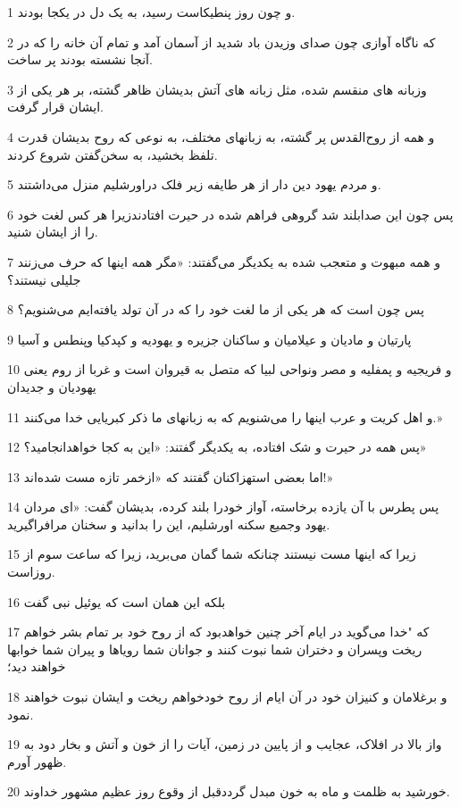 \par 1 و چون روز پنطیکاست رسید، به یک دل در یکجا بودند.
\par 2 که ناگاه آوازی چون صدای وزیدن باد شدید از آسمان آمد و تمام آن خانه را که در آنجا نشسته بودند پر ساخت.
\par 3 وزبانه های منقسم شده، مثل زبانه های آتش بدیشان ظاهر گشته، بر هر یکی از ایشان قرار گرفت.
\par 4 و همه از روح‌القدس پر گشته، به زبانهای مختلف، به نوعی که روح بدیشان قدرت تلفظ بخشید، به سخن‌گفتن شروع کردند.
\par 5 و مردم یهود دین دار از هر طایفه زیر فلک دراورشلیم منزل می‌داشتند.
\par 6 پس چون این صدابلند شد گروهی فراهم شده در حیرت افتادندزیرا هر کس لغت خود را از ایشان شنید.
\par 7 و همه مبهوت و متعجب شده به یکدیگر می‌گفتند: «مگر همه اینها که حرف می‌زنند جلیلی نیستند؟
\par 8 پس چون است که هر یکی از ما لغت خود را که در آن تولد یافته‌ایم می‌شنویم؟
\par 9 پارتیان و مادیان و عیلامیان و ساکنان جزیره و یهودیه و کپدکیا وپنطس و آسیا
\par 10 و فریجیه و پمفلیه و مصر ونواحی لبیا که متصل به قیروان است و غربا از روم یعنی یهودیان و جدیدان
\par 11 و اهل کریت و عرب اینها را می‌شنویم که به زبانهای ما ذکر کبریایی خدا می‌کنند.»
\par 12 پس همه در حیرت و شک افتاده، به یکدیگر گفتند: «این به کجا خواهدانجامید؟»
\par 13 اما بعضی استهزاکنان گفتند که «ازخمر تازه مست شده‌اند!»
\par 14 پس پطرس با آن یازده برخاسته، آواز خودرا بلند کرده، بدیشان گفت: «ای مردان یهود وجمیع سکنه اورشلیم، این را بدانید و سخنان مرافرا‌گیرید.
\par 15 زیرا که اینها مست نیستند چنانکه شما گمان می‌برید، زیرا که ساعت سوم از روزاست.
\par 16 بلکه این همان است که یوئیل نبی گفت
\par 17 که "خدا می‌گوید در ایام آخر چنین خواهدبود که از روح خود بر تمام بشر خواهم ریخت وپسران و دختران شما نبوت کنند و جوانان شما رویاها و پیران شما خوابها خواهند دید؛
\par 18 و برغلامان و کنیزان خود در آن ایام از روح خودخواهم ریخت و ایشان نبوت خواهند نمود.
\par 19 واز بالا در افلاک، عجایب و از پایین در زمین، آیات را از خون و آتش و بخار دود به ظهور آورم.
\par 20 خورشید به ظلمت و ماه به خون مبدل گرددقبل از وقوع روز عظیم مشهور خداوند.

